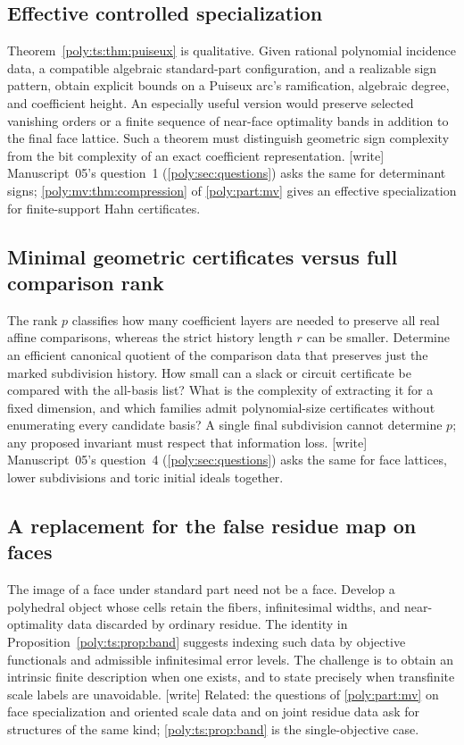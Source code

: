 \documentclass[11pt,a4paper]{article}
\numberwithin{equation}{section}
\theoremstyle{plain}
\newcommand{\wtag}{\textup{[write]}}%
\begin{document}
\subsection{Effective controlled specialization}
Theorem~\ref{poly:ts:thm:puiseux} is qualitative. Given rational polynomial
incidence data, a compatible algebraic standard-part configuration, and
a realizable sign pattern, obtain explicit bounds on a Puiseux arc's ramification,
algebraic degree, and coefficient height. An especially useful version
would preserve selected vanishing orders or a finite sequence of near-face
optimality bands in addition to the final face lattice. Such a theorem
must distinguish geometric sign complexity from the bit complexity of
an exact coefficient representation.
\wtag{} Manuscript~05's question~1 (\cref{poly:sec:questions}) asks the same
for determinant signs; \cref{poly:mv:thm:compression} of
\cref{poly:part:mv} gives an effective specialization for finite-support
Hahn certificates.

\subsection{Minimal geometric certificates versus full comparison rank}
The rank $p$ classifies how many coefficient layers are needed to preserve
all real affine comparisons, whereas the strict history length $r$ can
be smaller. Determine an efficient canonical quotient of the comparison
data that preserves just the marked subdivision history. How small can a
slack or circuit certificate be compared with the all-basis list? What is
the complexity of extracting it for a fixed dimension, and which
families admit polynomial-size certificates without enumerating every
candidate basis? A single final subdivision cannot determine $p$; any
proposed invariant must respect that information loss.
\wtag{} Manuscript~05's question~4 (\cref{poly:sec:questions}) asks the same
for face lattices, lower subdivisions and toric initial ideals together.

\subsection{A replacement for the false residue map on faces}\label{poly:ts:q:residue}
The image of a face under standard part need not be a face. Develop a
polyhedral object whose cells retain the fibers, infinitesimal widths,
and near-optimality data discarded by ordinary residue. The identity in
Proposition~\ref{poly:ts:prop:band} suggests indexing such data by objective
functionals and admissible infinitesimal error levels. The challenge is
to obtain an intrinsic finite description when one exists, and to state
precisely when transfinite scale labels are unavoidable.
\wtag{} Related: the questions of \cref{poly:part:mv} on face specialization
and oriented scale data and on joint residue data ask for structures of the
same kind; \cref{poly:ts:prop:band} is the single-objective case.
\end{document}
